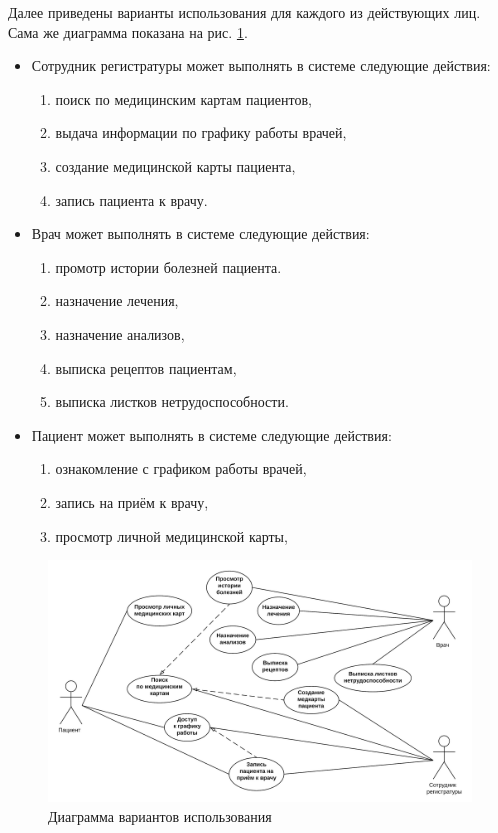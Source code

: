 \documentclass[14pt,a4paper,russian]{extreport}
\begin{document}
Далее приведены варианты использования для каждого из действующих лиц. Сама же диаграмма показана на
рис. \ref{fig:ClinicDB}.
\begin{itemize}[noitemsep]
    \item Сотрудник регистратуры может выполнять в системе следующие действия:
        \begin{enumerate}[noitemsep]
            \item поиск по медицинским картам пациентов,
            \item выдача информации по графику работы врачей,
            \item создание медицинской карты пациента,
            \item запись пациента к врачу.
        \end{enumerate}
    \item Врач может выполнять в системе следующие действия:
        \begin{enumerate}[noitemsep]
            \item промотр истории болезней пациента.
            \item назначение лечения,
            \item назначение анализов,
            \item выписка рецептов пациентам,
            \item выписка листков нетрудоспособности.
        \end{enumerate}
    \item Пациент может выполнять в системе следующие действия:
        \begin{enumerate}[noitemsep]
            \item ознакомление с графиком работы врачей,
            \item запись на приём к врачу,
            \item просмотр личной медицинской карты,
        \end{enumerate}
\end{itemize}
\begin{figure}[h!]
        \includegraphics[width=\textwidth]{ClinicDB}
        \caption{Диаграмма вариантов использования}
        \label{fig:ClinicDB}
\end{figure}
\end{document}
